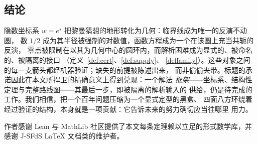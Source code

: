 \subsection*{结论}
隐数坐标系 $w=e^{s}$ 把黎曼猜想的地形转化为几何：临界线成为唯一的反演不动圆，
数 $1/2$ 成为其半径被强制的对数值，函数方程成为一个在该圆上充当共轭的反演，
零点被限制在以其为几何中心的圆环内，而解析困难成为显式的、被命名的、被隔离的接口
（定义~\ref{def:cert}、\ref{def:supply}、
\ref{deffamily}）。这些对象之间的每一支箭头都经机器验证；缺失的前提被陈述出来，
而非偷偷夹带。标题的承诺因此在本文所捍卫的精确意义上得到兑现：一个解法
\emph{框架}——坐标系、结构性定理与完整路线图——其最后一步，即被隔离的解析输入的
供给，仍是待完成的工作。我们相信，把一个百年问题压缩为一个显式定型的黑盒、
四面八方环绕着经过验证的结构，本身就是一项贡献：它告诉未来的努力确切应当往哪里
用力。

\begin{acknowledgement}
作者感谢 Lean 与 MathLib 社区提供了本文每条定理赖以立足的形式数学库，并感谢
J-SFdS \LaTeX{} 文档类的维护者。
\end{acknowledgement}



